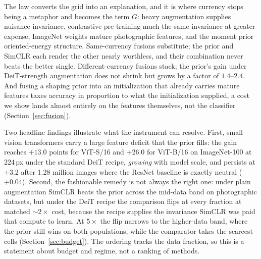The law converts the grid into an explanation, and it is where currency stops
being a metaphor and becomes the term $G$: heavy augmentation supplies
nuisance-invariance, contrastive pre-training much the same invariance at
greater expense, ImageNet weights mature photographic features, and the moment
prior oriented-energy structure.
Same-currency fusions substitute; the prior and SimCLR each render the
other nearly worthless, and their combination never beats the better
single. Different-currency fusions stack; the prior's gain under
DeiT-strength augmentation does not shrink but grows by a factor of
$1.4$--$2.4$. And fusing a shaping prior into an initialization that
already carries mature features taxes accuracy in proportion to what the
initialization supplied, a cost we show lands almost entirely on the features themselves, not the classifier
(Section~\ref{sec:fusion}).

Two headline findings illustrate what the instrument can resolve. First,
small vision transformers carry a large feature deficit that the prior
fills: the gain reaches $+13.0$ points for ViT-S/16 and $+26.0$ for
ViT-B/16 on ImageNet-100 at $224$\,px under the standard DeiT recipe,
\emph{growing} with model scale, and persists at $+3.2$ after 1.28 million
images where the ResNet baseline is exactly neutral ($+0.04$). Second, the fashionable remedy is not always the
right one: under plain augmentation SimCLR beats the prior across the
mid-data band on photographic datasets, but under the DeiT recipe the
comparison flips at every fraction at matched ${\sim}2\times$ cost, because the
recipe supplies the invariance SimCLR was paid that compute to learn. At
$5\times$ the flip narrows to the higher-data band, where the prior still wins
on both populations, while the comparator takes the scarcest cells
(Section~\ref{sec:budget}). The ordering tracks the data fraction, so this is
a statement about budget and regime, not a ranking of methods.

